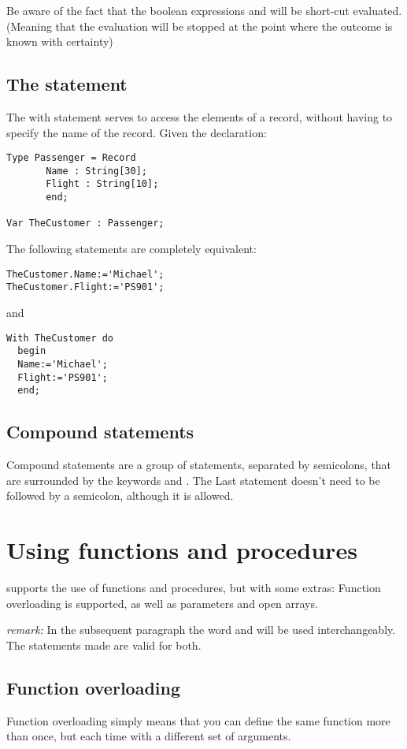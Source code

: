 \documentclass{report}
\begin{document}
Be aware of the fact that the boolean expressions  and
 will be short-cut evaluated. (Meaning that the evaluation
will be stopped at the point where the outcome is known with certainty)

\subsection{The  statement}
The with statement serves to access the elements of a record, without
having to specify the name of the record. Given the declaration:
\begin{verbatim}
Type Passenger = Record
       Name : String[30];
       Flight : String[10];
       end;

Var TheCustomer : Passenger;
\end{verbatim}
The following statements are completely equivalent:
\begin{verbatim}
TheCustomer.Name:='Michael';
TheCustomer.Flight:='PS901';
\end{verbatim}
and
\begin{verbatim}
With TheCustomer do
  begin
  Name:='Michael';
  Flight:='PS901';
  end;
\end{verbatim}
 
\subsection{Compound statements}
Compound statements are a group of statements, separated by semicolons, 
that are surrounded by the keywords  and . The
Last statement doesn't need to be followed by a semicolon, although it is
allowed.

\section{Using functions and procedures}
\fpc supports the use of functions and procedures, but with some extras:
Function overloading is supported, as well as  parameters and
open arrays.

{\em remark:} In the subsequent paragraph the word  and
 will be used interchangeably. The statements made are
valid for both.

\subsection{Function overloading}
Function overloading simply means that you can define the same function more
than once, but each time with a different set of arguments.
\end{document}
